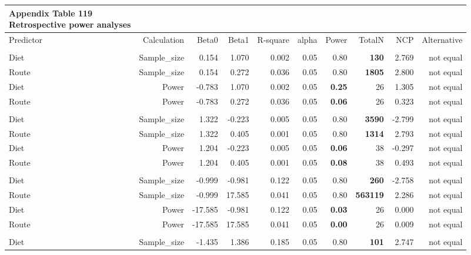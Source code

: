 \documentclass[
  12pt,
  letterpaper,
]{article}
\begin{document}
\begin{longtable}{l|rrrrrrrrr}
\caption*{
{\large \textbf{Appendix Table 119}} \\ 
{\small \textbf{Retrospective power analyses}}
} \\ 
\toprule
\multicolumn{1}{l}{Predictor} & Calculation & Beta0 & Beta1 & R-square & alpha & Power & TotalN & NCP & Alternative \\ 
\midrule\addlinespace[2.5pt]
\multicolumn{10}{l}{Brain} \\ 
\midrule\addlinespace[2.5pt]
Diet & Sample\_size & 0.154 & 1.070 & 0.002 & 0.05 & 0.80 & \textbf{130} & 2.769 & not equal \\ 
Route & Sample\_size & 0.154 & 0.272 & 0.036 & 0.05 & 0.80 & \textbf{1805} & 2.800 & not equal \\ 
Diet & Power & -0.783 & 1.070 & 0.002 & 0.05 & \textbf{0.25} & 26 & 1.305 & not equal \\ 
Route & Power & -0.783 & 0.272 & 0.036 & 0.05 & \textbf{0.06} & 26 & 0.323 & not equal \\ 
\midrule\addlinespace[2.5pt]
\multicolumn{10}{l}{Ear} \\ 
\midrule\addlinespace[2.5pt]
Diet & Sample\_size & 1.322 & -0.223 & 0.005 & 0.05 & 0.80 & \textbf{3590} & -2.799 & not equal \\ 
Route & Sample\_size & 1.322 & 0.405 & 0.001 & 0.05 & 0.80 & \textbf{1314} & 2.793 & not equal \\ 
Diet & Power & 1.204 & -0.223 & 0.005 & 0.05 & \textbf{0.06} & 38 & -0.297 & not equal \\ 
Route & Power & 1.204 & 0.405 & 0.001 & 0.05 & \textbf{0.08} & 38 & 0.493 & not equal \\ 
\midrule\addlinespace[2.5pt]
\multicolumn{10}{l}{Eye} \\ 
\midrule\addlinespace[2.5pt]
Diet & Sample\_size & -0.999 & -0.981 & 0.122 & 0.05 & 0.80 & \textbf{260} & -2.758 & not equal \\ 
Route & Sample\_size & -0.999 & 17.585 & 0.041 & 0.05 & 0.80 & \textbf{563119} & 2.286 & not equal \\ 
Diet & Power & -17.585 & -0.981 & 0.122 & 0.05 & \textbf{0.03} & 26 & 0.000 & not equal \\ 
Route & Power & -17.585 & 17.585 & 0.041 & 0.05 & \textbf{0.00} & 26 & 0.009 & not equal \\ 
\midrule\addlinespace[2.5pt]
\multicolumn{10}{l}{Liver} \\ 
\midrule\addlinespace[2.5pt]
Diet & Sample\_size & -1.435 & 1.386 & 0.185 & 0.05 & 0.80 & \textbf{101} & 2.747 & not equal \\ 

\end{longtable}
\end{document}
